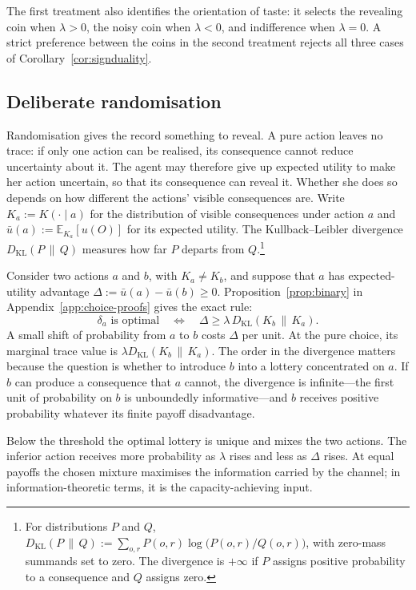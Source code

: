\documentclass[11pt,a4paper]{article}
\theoremstyle{definition}
\newcommand{\E}{\mathbb E}
\newcommand{\KL}{D_{\mathrm{KL}}}
\newcommand{\1}{\mathbf 1}
\begin{document}
The first treatment also identifies the orientation of taste: it selects the revealing coin when $\lambda>0$,
the noisy coin when $\lambda<0$, and indifference when $\lambda=0$.  A strict preference between the coins in
the second treatment rejects all three cases of Corollary~\ref{cor:signduality}.


\subsection{Deliberate randomisation}\label{sec:randomisation}

Randomisation gives the record something to reveal.  A pure action leaves no
trace: if only one action can be realised, its consequence cannot reduce uncertainty about it.  The
agent may therefore give up expected utility to make her action uncertain, so that its consequence can reveal
it.  Whether she does so depends on how different the actions' visible consequences are.  Write
$K_a:=K(\cdot\mid a)$ for the distribution of visible consequences under action $a$ and
$\bar u(a):=\E_{K_a}[u(O)]$ for its expected utility.  The Kullback--Leibler divergence
$\KL(P\,\|\,Q)$ measures how far $P$ departs from $Q$.\footnote{For distributions $P$ and $Q$,
$\KL(P\,\|\,Q):=\sum_{o,r}P(o,r)\log\bigl(P(o,r)/Q(o,r)\bigr)$, with zero-mass summands set to zero.  The
divergence is $+\infty$ if $P$ assigns positive probability to a consequence and $Q$ assigns zero.}

Consider two actions $a$ and $b$, with $K_a\ne K_b$, and suppose that $a$ has expected-utility advantage
$\Delta:=\bar u(a)-\bar u(b)\ge0$.  Proposition~\ref{prop:binary} in
Appendix~\ref{app:choice-proofs} gives the exact rule:
\[
 \delta_a\text{ is optimal}
 \quad\Longleftrightarrow\quad
 \Delta\ge\lambda\,\KL(K_b\,\|\,K_a).
\]
A small shift of probability from $a$ to $b$ costs $\Delta$ per unit.  At the pure choice, its marginal trace
value is $\lambda\KL(K_b\,\|\,K_a)$.  The order in the divergence matters because the question is whether to
introduce $b$ into a lottery concentrated on $a$.  If $b$ can produce a consequence that $a$ cannot, the
divergence is infinite---the first unit of probability on $b$ is unboundedly informative---and $b$ receives
positive probability whatever its finite payoff disadvantage.

Below the threshold the optimal lottery is unique and mixes the two actions.  The inferior action receives more
probability as $\lambda$ rises and less as $\Delta$ rises.  At equal payoffs the chosen mixture maximises the
information carried by the channel; in information-theoretic terms, it is the capacity-achieving input. %
\end{document}
